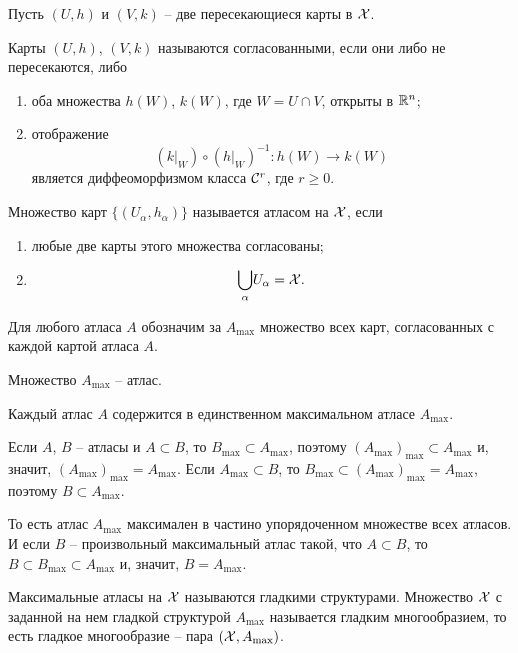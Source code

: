 	\begin{mdef}
		Пусть $(U, h)$ и $(V, k)$ -- две пересекающиеся карты в $\mathcal{X}$.
		
		Карты $(U, h)$, $(V, k)$ называются согласованными, если они либо не пересекаются, либо
		\begin{enumerate}
			\item оба множества $h(W)$, $k(W)$, где $W= U \cap V$, открыты в $\mathbb{R}^n$;
			\item отображение
			$$
				\left( \left. k \right|_W \right) \circ \left( \left. h \right|_W \right)^{-1}\colon h(W) \to k(W)
			$$
			является диффеоморфизмом класса $\mathcal{C}^r$, где $r \ge 0$.
		\end{enumerate}
	\end{mdef}

	\begin{mdef}
		Множество карт $\{ (U_\alpha, h_\alpha)\}$ называется атласом на $\mathcal{X}$, если
		\begin{enumerate}
			\item любые две карты этого множества согласованы;
			\item $$
				\underset{\alpha}{\bigcup}U_\alpha = \mathcal{X}.
			$$
		\end{enumerate}
	\end{mdef}
	
	Для любого атласа $A$ обозначим за $A_{\max}$ множество всех карт, согласованных с каждой картой атласа $A$.
	
	\begin{theorem}
		Множество $A_{\max}$ -- атлас.
	\end{theorem}

	\begin{corollary}
		Каждый атлас $A$ содержится в единственном максимальном атласе $A_{\max}$.
	\end{corollary}
	\begin{Proof}
		Если $A$, $B$ -- атласы и $A \subset B$, то $B_{\max} \subset A_{\max}$, поэтому $(A_{\max})_{\max} \subset A_{\max}$ и, значит, $(A_{\max})_{\max} = A_{\max}$.
	Если $A_{\max} \subset B$, то $B_{\max}\subset (A_{\max})_{\max} = A_{\max}$, поэтому $B \subset A_{\max}$.
	
	То есть атлас $A_{\max}$ максимален в частино упорядоченном множестве всех атласов. И если $B$ -- произвольный максимальный атлас такой, что $A \subset B$, то $B \subset B_{\max} \subset A_{\max}$ и, значит, $B = A_{\max}$.
	\end{Proof}
	\begin{mdef}
		Максимальные атласы на $\mathcal{X}$ называются гладкими структурами. Множество $\mathcal{X}$ с заданной на нем гладкой структурой $A_{\max}$ называется гладким многообразием, то есть гладкое многообразие -- пара $(\mathcal{X}, A_{\max})$.
	\end{mdef}

